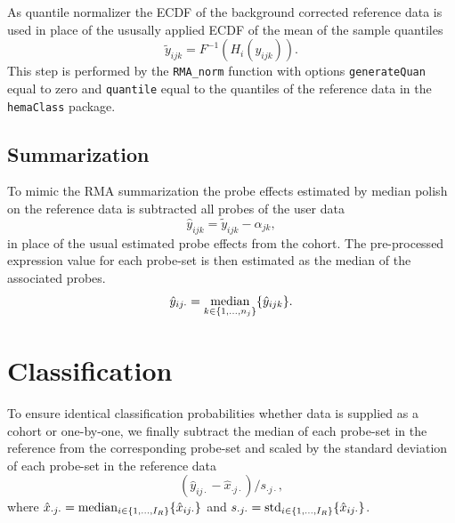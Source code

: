 \documentclass{article}
\begin{document}
As quantile normalizer the ECDF of the background corrected reference data is used in place of the ususally applied ECDF of the mean of the sample quantiles
\begin{equation*}
   \tilde{y}_{ijk} = F^{-1}(H_i(y_{ijk})).
\end{equation*}
This step is performed by the \texttt{RMA\_norm} function with options \texttt{generateQuan} equal to zero and \texttt{quantile} equal to the quantiles of the reference data in the \texttt{hemaClass} package.


\subsection{Summarization}

To mimic the RMA summarization the probe effects estimated by median polish on the reference data is subtracted all probes of the user data
\begin{equation*}
   \hat{y}_{ijk} = \tilde{y}_{ijk} - \hat{\alpha}_{jk},
\end{equation*}
in place of the usual estimated probe effects from the cohort.
The pre-processed expression value for each probe-set is then estimated as the median of the associated probes.
\begin{equation*}
   \hat{y}_{ij\cdot} = \operatorname*{median}_{k \in \{1,\dots,n_j \}} \{ \hat{y}_{ijk} \}.
\end{equation*}


\section{Classification}
To ensure identical classification probabilities whether data is supplied as a cohort or one-by-one, we finally subtract the median of each probe-set in the reference from the corresponding probe-set and scaled by the standard deviation of each probe-set in the reference data
\begin{equation*}
  (\hat{y}_{ij\cdot} - \hat{x}_{\cdot j\cdot})/s_{\cdot j\cdot},
\end{equation*}
where
$\hat{x}_{\cdot j\cdot} = \operatorname*{median}_{i \in \{1,\dots,I_R \}} \{\hat{x}_{ij\cdot}\}$ and $s_{\cdot j\cdot} = \operatorname*{std}_{i \in \{1,\dots,I_R\}} \{\hat{x}_{ij\cdot}\}$.





{}

\end{document}
